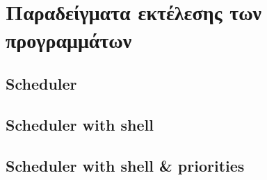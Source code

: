 \documentclass[a4paper,10pt]{article} \usepackage{anysize}
\begin{document}
\subsection{}
\inputminted[linenos,fontsize=\footnotesize,frame=leftline]{c}{files/scheduler_1.1.c}
\subsection{}
\inputminted[linenos,fontsize=\footnotesize,frame=leftline]{c}{files/scheduler-shell_1.2.c}
\subsection{}
\inputminted[linenos,fontsize=\footnotesize,frame=leftline]{c}{files/scheduler-shell_1.3.c}

\section*{Παραδείγματα εκτέλεσης των προγραμμάτων}
\def\thesubsection {Πρόγραμμα \arabic{section}.\arabic{subsection}:}
\setcounter{subsection}{0}
\subsection{Scheduler}

\subsection{Scheduler with shell}

\subsection{Scheduler with shell \& priorities}

\end{document}
